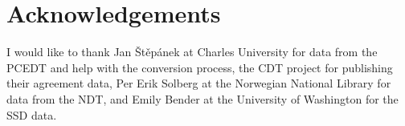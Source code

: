 \documentclass[11pt]{article}
\let\backmatter=\relax %
\begin{document}
\section*{Acknowledgements}
I would like to thank Jan \v{S}t\v{e}p\'anek at Charles University for data
from the PCEDT and help with the conversion process, the CDT project for
publishing their agreement data, Per Erik Solberg at the Norwegian National
Library for data from the NDT, and Emily Bender at the University of
Washington for the SSD data.

\backmatter
{}


\end{document}
